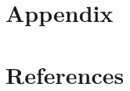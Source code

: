 \documentclass{article}
\begin{document}
\section*{Appendix}

% 

\section*{References}
\end{document}
